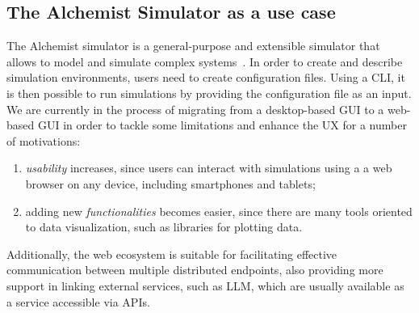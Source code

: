 \documentclass[conference]{IEEEtran}
\begin{document}
\subsection{The Alchemist Simulator as a use case}
The Alchemist simulator is a general-purpose and extensible simulator that allows to model and simulate complex systems~\cite{Pianini_2013}.
%
In order to create and describe simulation environments,
users need to create configuration files.
%
Using a \ac{CLI},
it is then possible to run simulations by providing the configuration file as an input.
%
We are currently in the process of migrating from a desktop-based \ac{GUI} to a web-based \ac{GUI} in order to tackle some limitations and enhance the \ac{UX} for a number of motivations:
\begin{enumerate}
    \item \emph{usability} increases,
    since users can interact with simulations using a a web browser on any device,
    including smartphones and tablets;
    \item adding new \emph{functionalities} becomes easier,
    since there are many tools oriented to data visualization,
    such as libraries for plotting data.
\end{enumerate}
%
%
%
%
Additionally,
the web ecosystem is suitable for facilitating effective communication between multiple distributed endpoints,
also providing more support in linking external services,
such as \ac{LLM},
which are usually available as a service accessible via \acp{API}.
%
\end{document}
